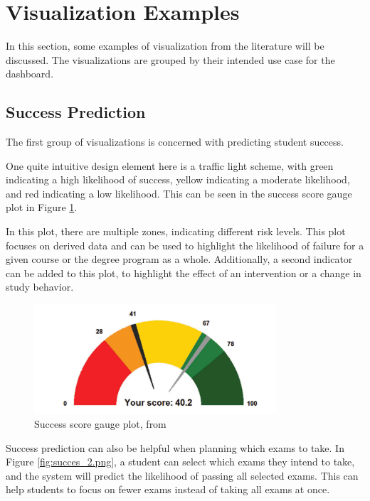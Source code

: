 \section{Visualization Examples}
\label{sec:examples}

In this section, some examples of visualization from the literature will be discussed. The visualizations are grouped by their intended use case for the dashboard.

\subsection{Success Prediction}
\label{subsec:success_prediction}

The first group of visualizations is concerned with predicting student success.

One quite intuitive design element here is a traffic light scheme, with green indicating a high likelihood of success, yellow indicating a moderate likelihood, and red indicating a low likelihood. This can be seen in the success score gauge plot in Figure \ref{fig:trajectory}.

In this plot, there are multiple zones, indicating different risk levels. This plot focuses on derived data and can be used to highlight the likelihood of failure for a given course or the degree program as a whole. Additionally, a second indicator can be added to this plot, to highlight the effect of an intervention or a change in study behavior.


\begin{figure}
    \centering
    \includegraphics[width=0.8\textwidth]{figures/success_1.png}
    \caption{Success score gauge plot, from \cite{PredictingSuccess}}
    \label{fig:trajectory}
\end{figure}

Success prediction can also be helpful when planning which exams to take. In Figure \ref{fig:succes_2.png}, a student can select which exams they intend to take, and the system will predict the likelihood of passing all selected exams.
This can help students to focus on fewer exams instead of taking all exams at once.

